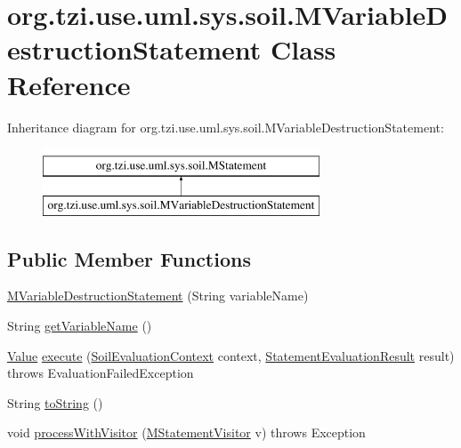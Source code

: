 \hypertarget{classorg_1_1tzi_1_1use_1_1uml_1_1sys_1_1soil_1_1_m_variable_destruction_statement}{\section{org.\-tzi.\-use.\-uml.\-sys.\-soil.\-M\-Variable\-Destruction\-Statement Class Reference}
\label{classorg_1_1tzi_1_1use_1_1uml_1_1sys_1_1soil_1_1_m_variable_destruction_statement}
}
Inheritance diagram for org.\-tzi.\-use.\-uml.\-sys.\-soil.\-M\-Variable\-Destruction\-Statement\-:\begin{figure}[H]
\begin{center}
\leavevmode
\includegraphics[height=2.000000cm]{classorg_1_1tzi_1_1use_1_1uml_1_1sys_1_1soil_1_1_m_variable_destruction_statement}
\end{center}
\end{figure}
\subsection*{Public Member Functions}
\begin{DoxyCompactItemize}
\item 
\hyperlink{classorg_1_1tzi_1_1use_1_1uml_1_1sys_1_1soil_1_1_m_variable_destruction_statement_abe9756adcbf22a09dfd69d768dbc0093}{M\-Variable\-Destruction\-Statement} (String variable\-Name)
\item 
String \hyperlink{classorg_1_1tzi_1_1use_1_1uml_1_1sys_1_1soil_1_1_m_variable_destruction_statement_a42c20cbf8ca0e615eeed267f787d032d}{get\-Variable\-Name} ()
\item 
\hyperlink{classorg_1_1tzi_1_1use_1_1uml_1_1ocl_1_1value_1_1_value}{Value} \hyperlink{classorg_1_1tzi_1_1use_1_1uml_1_1sys_1_1soil_1_1_m_variable_destruction_statement_a3c74ac41c6752d48e018054512fe139d}{execute} (\hyperlink{classorg_1_1tzi_1_1use_1_1uml_1_1sys_1_1soil_1_1_soil_evaluation_context}{Soil\-Evaluation\-Context} context, \hyperlink{classorg_1_1tzi_1_1use_1_1uml_1_1sys_1_1_statement_evaluation_result}{Statement\-Evaluation\-Result} result)  throws Evaluation\-Failed\-Exception 
\item 
String \hyperlink{classorg_1_1tzi_1_1use_1_1uml_1_1sys_1_1soil_1_1_m_variable_destruction_statement_a5358436251bdd6c13653a97b277e9e7a}{to\-String} ()
\item 
void \hyperlink{classorg_1_1tzi_1_1use_1_1uml_1_1sys_1_1soil_1_1_m_variable_destruction_statement_a7a70396efce9690914355df59e98a44f}{process\-With\-Visitor} (\hyperlink{interfaceorg_1_1tzi_1_1use_1_1uml_1_1sys_1_1soil_1_1_m_statement_visitor}{M\-Statement\-Visitor} v)  throws Exception 
\end{DoxyCompactItemize}
